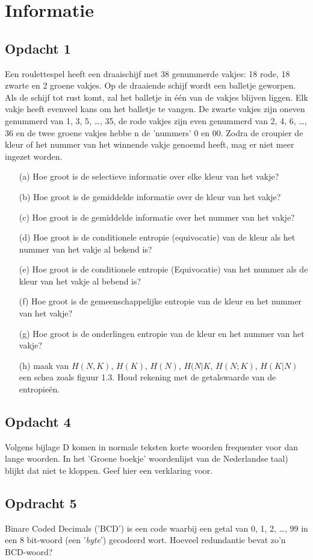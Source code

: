 \chapter{Informatie}

\section{Opdacht 1}
Een roulettespel heeft een draaischijf met 38 genummerde vakjes: 18 rode, 18 zwarte en 2 groene vakjes. Op de draaiende schijf wordt een balletje geworpen. Als de schijf tot rust komt, zal het balletje in \'{e}\'{e}n van de vakjes blijven liggen. Elk vakje heeft evenveel kans om het balletje te vangen. De zwarte vakjes zijn oneven genummerd van 1, 3, 5, \ldots, 35, de rode vakjes zijn even genummerd van 2, 4, 6, \ldots, 36 en de twee groene vakjes hebbe n de 'nummers' 0 en 00. Zodra de croupier de kleur of het nummer van het winnende vakje genoemd heeft, mag er niet meer ingezet worden.
\begin{itemize}
  \item[(a)] Hoe groot is de selectieve informatie over elke kleur van het vakje?
  \item[(b)] Hoe groot is de gemiddelde informatie over de kleur van het vakje?
  \item[(c)] Hoe groot is de gemiddelde informatie over het nummer van het vakje?
  \item[(d)] Hoe groot is de conditionele entropie (equivocatie) van de kleur als het nummer van het vakje al bekend is?
  \item[(e)] Hoe groot is de conditionele entropie (Equivocatie) van het nummer als de kleur van het vakje al bebend is?
  \item[(f)] Hoe groot is de gemeenschappelijke entropie van de kleur en het nummer van het vakje?
  \item[(g)] Hoe groot is de onderlingen entropie van de kleur en het nummer van het vakje?
  \item[(h)] maak van $H(N,K)$, $H(K)$, $H(N)$, $H(N|K$, $H(N;K)$, $H(K|N)$ een schea zoals figuur 1.3. Houd rekening met de getalswaarde van de entropie\"{e}n.
\end{itemize}

\section{Opdacht 4}
Volgens bijlage D komen in normale teksten korte woorden frequenter voor dan lange woorden. In het 'Groene boekje' woordenlijst van de Nederlandse taal) blijkt dat niet te kloppen.  Geef hier een verklaring voor. 

\section{Opdracht 5}
Binare Coded Decimals ('BCD') is een code waarbij een getal van 0, 1, 2, \ldots, 99 in een 8 bit-woord (een '\emph{byte}') gecodeerd wort. Hoeveel redundantie bevat zo'n BCD-woord?


